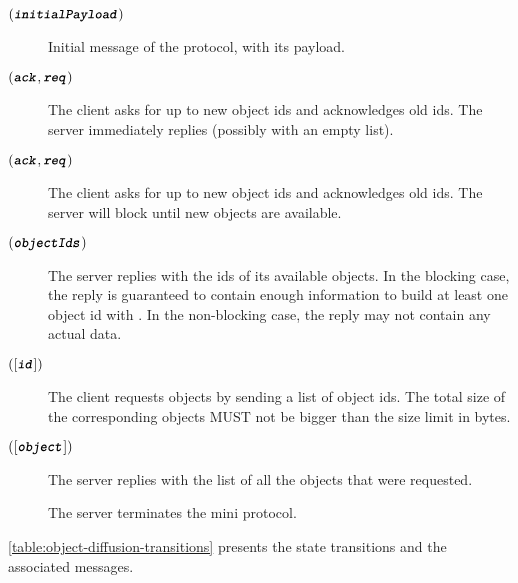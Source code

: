 \begin{description}
\item [\MsgInit{} {\((\textbf{\texttt{\textit{initialPayload}}})\)}]
      Initial message of the protocol, with its payload.

\item [\MsgRequestObjIdsNB{} {$(\textbf{\texttt{\textit{ack}}},\textbf{\texttt{\textit{req}}})$}]
      The client asks for up to  new object ids and acknowledges  old ids.
      The server immediately replies (possibly with an empty list).

\item [\MsgRequestObjIdsB{} {$(\textbf{\texttt{\textit{ack}}},\textbf{\texttt{\textit{req}}})$}]
      The client asks for up to  new object ids and acknowledges  old ids.
      The server will block until new objects are available.

\item [\MsgReplyObjIds{} {$(\textbf{\texttt{\textit{objectIds}}})$}]
      The server replies with the ids of its available objects.
      In the blocking case, the reply is guaranteed to contain enough information to build at least one object id with .
      In the non-blocking case, the reply may not contain any actual data.

\item [\MsgRequestObjs{} {$([\textbf{\texttt{\textit{id}}}])$}]
      The client requests objects by sending a list of object ids.
      The total size of the corresponding objects MUST not be bigger than the size limit in bytes.

\item [\MsgReplyObjs{} {$([\textbf{\texttt{\textit{object}}}])$}]
      The server replies with the list of all the objects that were requested.

\item [\MsgDone]
      The server terminates the mini protocol.
\end{description}

\autoref{table:object-diffusion-transitions} presents the state transitions and
the associated messages.

